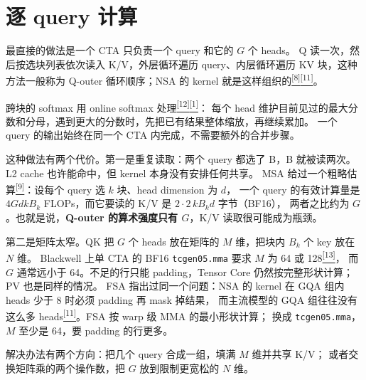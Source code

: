 \section{逐 query 计算}

最直接的做法是一个 CTA 只负责一个 query 和它的 $G$ 个 heads。 Q 读一次，然后按选块列表依次读入 K/V，外层循环遍历 query、内层循环遍历 KV 块，这种方法一般称为 Q-outer 循环顺序；NSA 的 kernel 就是这样组织的\hyperlink{ref-8}{\textsuperscript{[8]}}\hyperlink{ref-11}{\textsuperscript{[11]}}。

跨块的 softmax 用 online softmax 处理\hyperlink{ref-12}{\textsuperscript{[12]}}\hyperlink{ref-1}{\textsuperscript{[1]}}： 每个 head 维护目前见过的最大分数和分母，遇到更大的分数时，先把已有结果整体缩放，再继续累加。 一个 query 的输出始终在同一个 CTA 内完成，不需要额外的合并步骤。

这种做法有两个代价。第一是重复读取：两个 query 都选了 B，B 就被读两次。 L2 cache 也许能命中，但 kernel 本身没有安排任何共享。 MSA 给过一个粗略估算\hyperlink{ref-9}{\textsuperscript{[9]}}：设每个 query 选 $k$ 块、head dimension 为 $d$， 一个 query 的有效计算量是 $4Gdk B_k$ FLOPs，而它要读的 K/V 是 $2\cdot 2\,k B_k d$ 字节（BF16）， 两者之比约为 $G$。也就是说，\textbf{Q-outer 的算术强度只有 $G$}，K/V 读取很可能成为瓶颈。

第二是矩阵太窄。QK 把 $G$ 个 heads 放在矩阵的 $M$ 维，把块内 $B_k$ 个 key 放在 $N$ 维。 Blackwell 上单 CTA 的 BF16 \texttt{tcgen05.mma} 要求 $M$ 为 64 或 128\hyperlink{ref-13}{\textsuperscript{[13]}}， 而 $G$ 通常远小于 64。不足的行只能 padding，Tensor Core 仍然按完整形状计算；PV 也是同样的情况。 FSA 指出过同一个问题：NSA 的 kernel 在 GQA 组内 heads 少于 8 时必须 padding 再 mask 掉结果， 而主流模型的 GQA 组往往没有这么多 heads\hyperlink{ref-11}{\textsuperscript{[11]}}。FSA 按 warp 级 MMA 的最小形状计算； 换成 \texttt{tcgen05.mma}，$M$ 至少是 64，要 padding 的行更多。

解决办法有两个方向：把几个 query 合成一组，填满 $M$ 维并共享 K/V； 或者交换矩阵乘的两个操作数，把 $G$ 放到限制更宽松的 $N$ 维。
